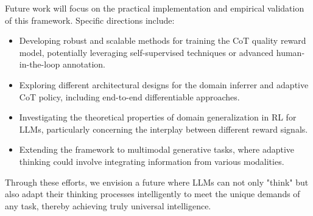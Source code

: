 \documentclass{article}
\begin{document}
Future work will focus on the practical implementation and empirical validation of this framework. Specific directions include:
\begin{itemize}
    \item Developing robust and scalable methods for training the CoT quality reward model, potentially leveraging self-supervised techniques or advanced human-in-the-loop annotation.
    \item Exploring different architectural designs for the domain inferrer and adaptive CoT policy, including end-to-end differentiable approaches.
    \item Investigating the theoretical properties of domain generalization in RL for LLMs, particularly concerning the interplay between different reward signals.
    \item Extending the framework to multimodal generative tasks, where adaptive thinking could involve integrating information from various modalities.
\end{itemize}

Through these efforts, we envision a future where LLMs can not only "think" but also adapt their thinking processes intelligently to meet the unique demands of any task, thereby achieving truly universal intelligence.
\end{document}
